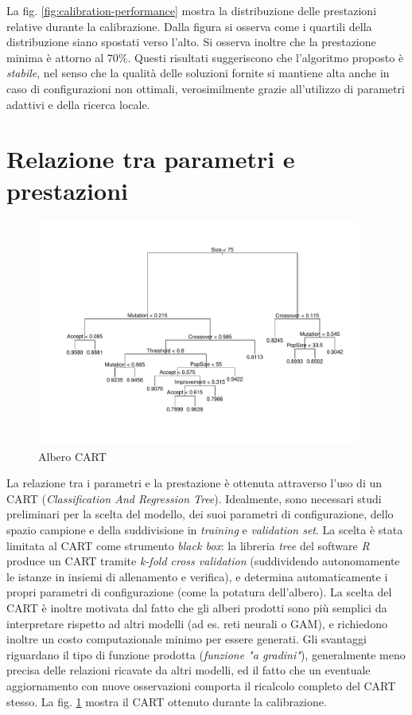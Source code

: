 \documentclass[a4paper, 10pt]{report}
\begin{document}
La fig. \ref{fig:calibration-performance} mostra la distribuzione delle
prestazioni relative durante la calibrazione. Dalla figura si osserva come
i quartili della distribuzione siano spostati verso l'alto. Si osserva
inoltre che la prestazione minima è attorno al $70\%$. Questi risultati
suggeriscono che l'algoritmo proposto è \emph{stabile}, nel senso che
la qualità delle soluzioni fornite si mantiene alta anche in caso di
configurazioni non ottimali, verosimilmente grazie all'utilizzo di
parametri adattivi e della ricerca locale.

\section{Relazione tra parametri e prestazioni}
\begin{figure}
  \centering
  \includegraphics[width=0.95\textwidth]{images/cart}
  \caption{Albero CART}
  \label{fig:calibration-cart}
\end{figure}

La relazione tra i parametri e la prestazione è ottenuta attraverso
l'uso di un CART (\emph{Classification And Regression Tree}).
Idealmente, sono necessari studi preliminari per la scelta
del modello, dei suoi parametri di configurazione, dello spazio
campione e della suddivisione in \emph{training} e \emph{validation set}.
La scelta è stata limitata al CART come strumento \emph{black box}:
la libreria \emph{tree} del software \emph{R} produce un CART
tramite \emph{k-fold cross validation} (suddividendo autonomamente
le istanze in insiemi di allenamento e verifica), e determina
automaticamente i propri parametri di configurazione (come la potatura
dell'albero). La scelta del CART è inoltre motivata dal fatto che
gli alberi prodotti sono più semplici da interpretare rispetto ad
altri modelli (ad es. reti neurali o GAM), e richiedono inoltre un
costo computazionale minimo per essere generati. Gli svantaggi riguardano
il tipo di funzione prodotta (\emph{funzione "a gradini"}),
generalmente meno precisa delle relazioni ricavate da altri modelli,
ed il fatto che un eventuale aggiornamento con nuove osservazioni
comporta il ricalcolo completo del CART stesso. La fig. \ref{fig:calibration-cart}
mostra il CART ottenuto durante la calibrazione.
\end{document}
